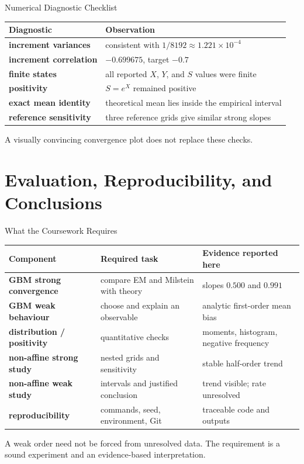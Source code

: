 \documentclass[aspectratio=169,10pt]{beamer}
\begin{document}
\begin{frame}{Numerical Diagnostic Checklist}
  \begin{center}
    \begin{tabularx}{\textwidth}{>{\bfseries}p{3.5cm}X}
      \toprule
      Diagnostic & Observation \\
      \midrule
      increment variances & consistent with $1/8192\approx1.221\times10^{-4}$ \\
      increment correlation & $-0.699675$, target $-0.7$ \\
      finite states & all reported $X$, $Y$, and $S$ values were finite \\
      positivity & $S=e^X$ remained positive \\
      exact mean identity & theoretical mean lies inside the empirical interval \\
      reference sensitivity & three reference grids give similar strong slopes \\
      \bottomrule
    \end{tabularx}
  \end{center}
  A visually convincing convergence plot does not replace these checks.
\end{frame}

\section{Evaluation, Reproducibility, and Conclusions}

\begin{frame}{What the Coursework Requires}
  \begin{tabularx}{\textwidth}{>{\bfseries}p{3.1cm}XX}
    \toprule
    Component & Required task & Evidence reported here \\
    \midrule
    GBM strong convergence & compare EM and Milstein with theory & slopes $0.500$ and $0.991$ \\
    GBM weak behaviour & choose and explain an observable & analytic first-order mean bias \\
    distribution / positivity & quantitative checks & moments, histogram, negative frequency \\
    non-affine strong study & nested grids and sensitivity & stable half-order trend \\
    non-affine weak study & intervals and justified conclusion & trend visible; rate unresolved \\
    reproducibility & commands, seed, environment, Git & traceable code and outputs \\
    \bottomrule
  \end{tabularx}
  \vspace{0.6em}
  A weak order need not be forced from unresolved data. The requirement is a
  sound experiment and an evidence-based interpretation.
\end{frame}
\end{document}
